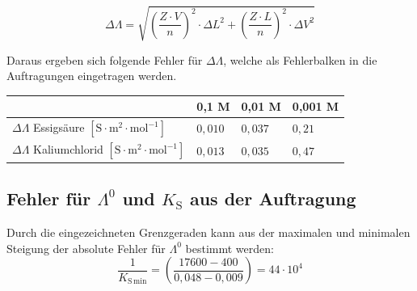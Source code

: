 \documentclass[12pt,a4paper,titlepage,headinclude,bibtotoc]{scrartcl}
\begin{document}



\begin{equation}
\Delta \Lambda = \sqrt{\left(\frac{Z \cdot V}{n}\right)^2 \cdot {\Delta L}^2 + \left(\frac{Z \cdot L}{n}\right)^2 \cdot \Delta V^2}
\end{equation}

Daraus ergeben sich folgende Fehler für $\Delta \Lambda$, welche als Fehlerbalken in die Auftragungen eingetragen werden.\\

\begin{table} [h]
\centering 
\begin{tabular}{|p{7cm}||p{2cm}|p{2cm}|p{2cm}|}
\hline
& 0,1 M & 0,01 M & 0,001 M \\
\hline
$\Delta \Lambda$ Essigsäure $[\mathrm{S \cdot m^{2} \cdot mol^{-1}}]$ & $0,010$ & $0,037$& $0,21$ \\
\hline
$\Delta \Lambda$ Kaliumchlorid $[\mathrm{S \cdot m^{2} \cdot mol^{-1}}]$ &$0,013$ & $0,035$ & $0,47$ \\
\hline
\end{tabular}
\end{table}





\newpage

\subsection{Fehler für $\Lambda^0$ und $K_{\mathrm{S}}$ aus der Auftragung}

Durch die eingezeichneten Grenzgeraden kann aus der maximalen und minimalen Steigung der absolute Fehler für $\Lambda^0$ bestimmt werden:\\


\begin{equation}
\frac{1}{K_{\mathrm{S}\,\mathrm{min}}} =\left( \frac{17600-400}{0,048-0,009} \right)= 44\cdot 10^4
\end{equation}
\end{document}
